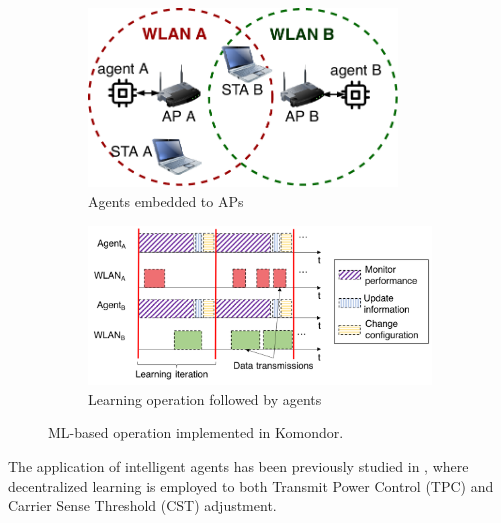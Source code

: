 \documentclass{article}
\begin{document}
	\begin{figure}[t!]
		\centering
		\begin{subfigure}[b]{0.6\columnwidth}			\includegraphics[width=0.9\textwidth]{wlan_agents.pdf}
			\caption{Agents embedded to APs}
			\label{fig:wlan_agents}
		\end{subfigure}
		\begin{subfigure}[b]{1\columnwidth}
		\includegraphics[width=\textwidth]{agents_operation.png}
			\caption{Learning operation followed by agents}
			\label{fig:agents_operation}
		\end{subfigure}
		\caption{ML-based operation implemented in Komondor.}
		\label{fig:agents_komondor}
	\end{figure}
	
	The application of intelligent agents has been previously studied in \cite{wilhelmi2019collaborative, wilhelmi2019potential}, where decentralized learning is employed to both Transmit Power Control (TPC) and Carrier Sense Threshold (CST) adjustment.
	
\end{document}
